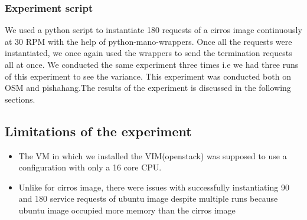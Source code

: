 \subsubsection{Experiment script}

We used a python script to instantiate 180 requests of a cirros image continuously at 30 RPM with the help of python-mano-wrappers. Once all the requests were instantiated, we once again used the wrappers to send the termination requests all at once. We conducted the same experiment three times i.e we had three runs of this experiment to see the variance. This experiment was conducted both on OSM and pishahang.The results of the experiment is discussed in the following sections.







\subsection{Limitations of the experiment}

\begin{itemize}
	\item The VM in which we installed the VIM(openstack) was supposed to use a configuration with only a 16 core CPU. 
	
	\item Unlike for cirros image, there were issues with successfully instantiating 90 and 180 service requests of ubuntu image despite multiple runs because ubuntu image occupied more memory than the cirros image
	

	
\end{itemize}




